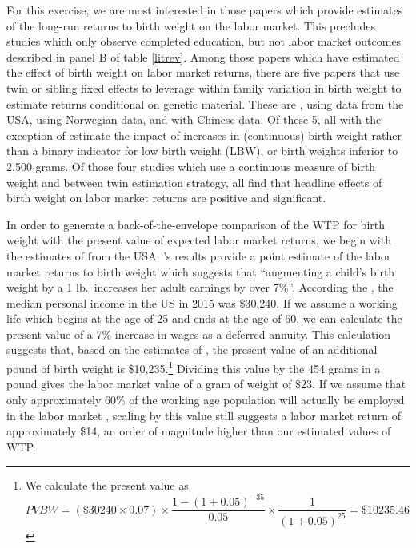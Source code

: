 \documentclass[a4paper, 11pt]{article}
\begin{document}
\begin{spacing}{1.4}
For this exercise, we are most interested in those papers which
provide estimates of the long-run returns to birth weight on the
labor market.  This precludes studies which only observe completed
education, but not labor market outcomes
described in panel B of table \ref{litrev}. %
 Among those papers which have estimated the effect
of birth weight on labor market returns, there are five papers that
use twin or sibling fixed effects to leverage within family variation
in birth weight to estimate returns conditional on genetic material.
These are \citet{BehrmanRosenzweig2004,JohnsonSchoeni2011,CookFletcher2015},
using data from the USA, \citet{Blacketal2007} using Norwegian data, and
\citet{RosenzweigZhang2013} with Chinese data.  Of these 5, all with
the exception of \citet{JohnsonSchoeni2011} estimate
the impact of increases in (continuous) birth weight rather than
a binary indicator for low birth weight (LBW), or birth weights
inferior to 2,500 grams.  Of those four studies which use a continuous
measure of birth weight and between twin estimation strategy, all find
that headline effects of birth weight on labor market returns are positive
and significant.

In order to generate a back-of-the-envelope comparison of the WTP
for birth weight with the present value of expected labor market
returns, we begin with the estimates of \citet{BehrmanRosenzweig2004}
from the USA.  \citet{BehrmanRosenzweig2004}'s results provide
a point estimate of the labor market returns to birth weight which
suggests that ``augmenting a child's birth weight by a 1 lb.\ increases
her adult earnings by over 7\%''.  According the \citet{USCB2016},
the median personal income in the US in 2015 was \$30,240.  If we assume
a working life which begins at the age of 25 and ends at the age of
60, we can calculate the present value of a 7\% increase in wages as
a deferred annuity.  This calculation suggests that, based on the
estimates of \citet{BehrmanRosenzweig2004}, the present value of an
additional pound of birth weight is \$10,235.\footnote{We calculate the
  present value as
  \[
  PVBW = (\$30240\times0.07)\times\frac{1-(1+0.05)^{-35}}{0.05}\times\frac{1}{(1+0.05)^{25}}=\$10235.46
  \]
}  Dividing this value by the 454 grams in a pound gives the labor
market value of a gram of weight of $\$23$.  If we assume
that only approximately 60\% of the working age population will
actually be employed in the labor market \citep{BLS2017}, scaling
by this value still suggests a labor market return of approximately
\$14, an order of magnitude higher than our estimated values of WTP.


\end{spacing}
\end{document}
